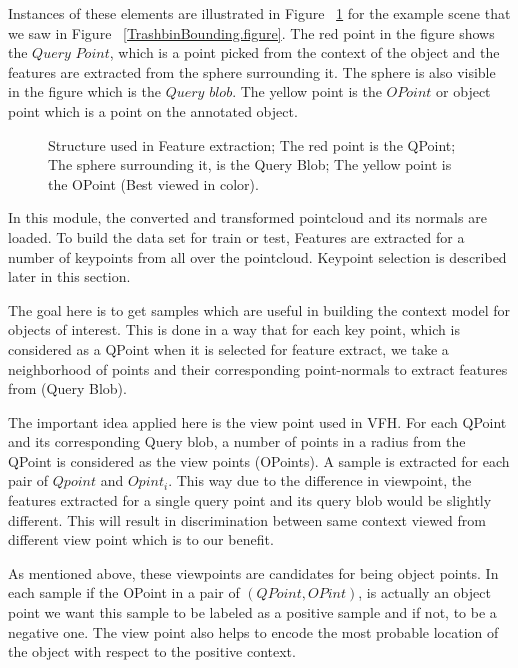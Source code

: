  Instances of these elements are illustrated in Figure ~\ref{FEStructure.figure} for the example scene that we saw in Figure 
 ~\ref{TrashbinBounding.figure}. 
 The red point in the figure shows the $Query$ $Point$, which is a point picked from the context of the object and the features are extracted from the sphere surrounding it. The sphere is also visible in the figure which is the 
$Query$ $blob$. 
 The yellow point is the $OPoint$ or object point which is a point on the annotated object. 
 
 \begin{figure}[t]
  \caption[Illustration of the items used in Feature Extract.]
  {Structure used in Feature extraction; The red point is the QPoint; The sphere surrounding it, is the Query Blob; The yellow
  point is the OPoint (Best viewed in color).}
  \label{FEStructure.figure}
\end{figure}
 
In this module, the converted and transformed pointcloud and its normals are loaded.
To build the data set for train or test, Features are extracted for a number of keypoints from all over 
the pointcloud.
Keypoint selection is described later in this section.

The goal here is to get samples which are useful in building the context model for objects of interest. 
This is done in a way that for each key point, which is considered as a QPoint when it is selected for feature extract, 
we take a neighborhood of points and their corresponding point-normals to extract features from (Query Blob). 

The important idea applied here is the view point used in VFH.
For each QPoint and its corresponding Query blob, a number of points in a radius from the QPoint is considered as the view points 
(OPoints).
A sample is extracted for each pair of $Qpoint$ and $Opint_i$.
This way due to the difference in viewpoint, the features extracted for a single query point and its query blob would be slightly 
different. 
This will result in discrimination between same context viewed from different view point which is to our benefit.

As mentioned above, these viewpoints are candidates for being object points.
In each sample if the OPoint in a pair of $(QPoint,OPint)$, is actually an object point we want this sample to be labeled as 
a positive sample and if not, to be a negative one. 
The view point also helps to encode the most probable location of the object with respect to the positive context. 

